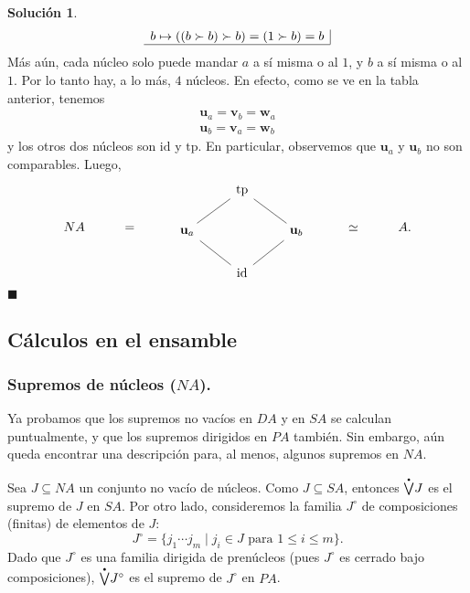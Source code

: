 \documentclass[12pt,letterpaper,titlepage]{article}
\newcommand{\xqed}[1]{%
  \leavevmode\unskip\penalty9999 \hbox{}\nobreak\hfill
  \quad\hbox{\ensuremath{#1}}}
\theoremstyle{definition}
\newtheorem*{soltemp}{Solución}
\newenvironment{sol}[1]{%
    \begin{soltemp}#1}{%
    \xqed{\blacksquare}\end{soltemp}%
}
\newcommand\pSup{%
    {\stackrel{\raisebox{-3pt}{\scalebox{0.5}{$\bullet$}}}{\bigvee}}
  }%
\newcommand\unuc[1]{\mathbf u_{#1}}
\newcommand\vnuc[1]{\mathbf v_{#1}}
\newcommand\wnuc[1]{\mathbf w_{#1}}
\newcommand\tps[2]{\texorpdfstring{#1}{#2}}
\newcommand\<{\langle}
\renewcommand\>{\rangle}
\newcommand{\id}{\mathrm{id}}
\newcommand{\tp}{\mathrm{tp}}
\begin{document}
\begin{sol}
\[\begin{array}{c|}
            b\mapsto ((b\succ b)\succ b) = (1\succ b) = b \\
            \hline
        \end{array}
    \]
    Más aún, cada núcleo solo puede mandar $a$ a sí misma
    o al $1$, y $b$ a sí misma o al $1$.
    Por lo tanto hay, a lo más, $4$ núcleos.
    En efecto, como se ve en la tabla anterior, tenemos
    \begin{align*}
        \unuc a = \vnuc b = \wnuc a \\
        \unuc b = \vnuc a = \wnuc b
    \end{align*}
    y los otros dos núcleos son $\id$ y $\tp$.
    En particular, observemos que $\unuc a$ y $\unuc b$ no son
    comparables.
    Luego, 
  \[
    NA\hspace{10mm} = \hspace{10mm}
    \begin{tikzcd}
      & \tp \\
      \unuc a \ar[ur,no head] && \unuc b \ar[ul,no head] \\
      & \id \ar[ur,no head] \ar[ul,no head]
    \end{tikzcd}
    \hspace{10mm} \simeq \hspace{10mm} A
  .\]
\end{sol}

\subsection{Cálculos en el ensamble}
\subsubsection{Supremos de núcleos \tps{($NA$)}{NA}.}

Ya probamos que los supremos no vacíos en $DA$ y en $SA$ se
calculan puntualmente, y que los supremos dirigidos en $PA$
también.
Sin embargo, aún queda encontrar una descripción para, al menos,
algunos supremos en $NA$.

Sea $J\subseteq NA$ un conjunto no vacío de núcleos.
Como $J\subseteq SA$, entonces $\pSup J$ es el supremo de $J$ en
$SA$.
Por otro lado, consideremos la familia $J^\circ$
de composiciones (finitas) de elementos de $J$:
\[
  J^\circ = \{j_1\cdots j_m \mid j_i\in J \text{ para } 1\leq
  i\leq m\}
.\]
Dado que $J^\circ$ es una familia dirigida de prenúcleos
(pues $J^\circ$ es cerrado bajo composiciones), $\pSup J^\circ$
es el supremo de $J^\circ$ en $PA$.
\end{document}
